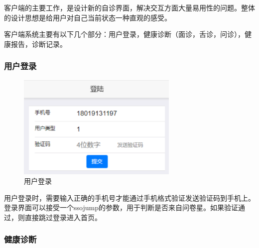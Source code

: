 客户端的主要工作，是设计新的自诊界面，解决交互方面大量易用性的问题。整体的设计思想是给用户对自己当前状态一种直观的感受。

客户端系统主要有以下几个部分：用户登录，健康诊断（面诊，舌诊，问诊），健康报告，诊断记录。

\subsubsection{用户登录}
\begin{figure}[ht]
    \centering
    \includegraphics[height=5cm]{images/login.png}
    \caption{用户登录}
    \label{fig:login}
\end{figure} 
用户登录时，需要输入正确的手机号才能通过手机格式验证发送验证码到手机上。登录界面可以接受一个ssojump的参数，用于判断是否来自问卷星。如果验证通过，则直接跳过登录进入首页。

\subsubsection{健康诊断}

